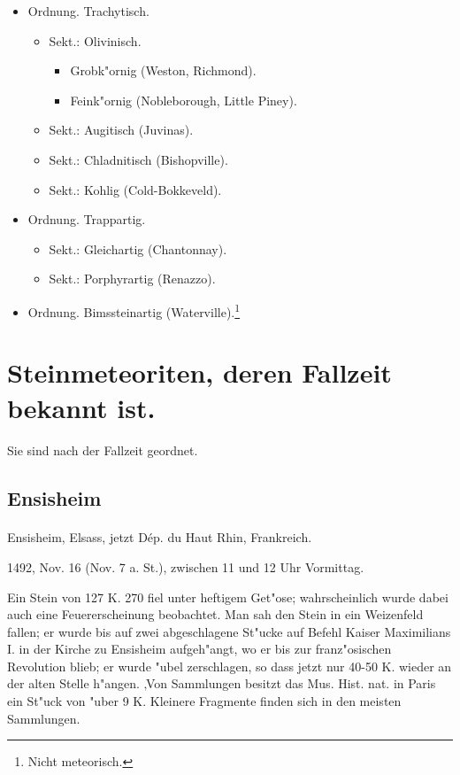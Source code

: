 \documentclass[a4paper, 11pt, oneside]{article}
\begin{document}
\begin{itemize}
    \item[1.] Ordnung. Trachytisch.
    \begin{itemize}
        \item[1.] Sekt.: Olivinisch.
        \begin{itemize}
            \item[a.] Grobk"ornig (Weston, Richmond).
            \item[b.] Feink"ornig (Nobleborough, Little Piney).
        \end{itemize}
        \item[2.] Sekt.: Augitisch (Juvinas).
        \item[3.] Sekt.: Chladnitisch (Bishopville).
        \item[4.] Sekt.: Kohlig (Cold-Bokkeveld).
    \end{itemize}
    \item[2.] Ordnung. Trappartig.
    \begin{itemize}
        \item[1.] Sekt.: Gleichartig (Chantonnay).
        \item[2.] Sekt.: Porphyrartig (Renazzo).
    \end{itemize}
    \item[3.] Ordnung. Bimssteinartig (Waterville).\footnote{Nicht meteorisch.}
\end{itemize}
\clearpage
\section{Steinmeteoriten, deren Fallzeit bekannt ist.}
\paragraph{}
Sie sind nach der Fallzeit geordnet.
\subsection{Ensisheim}
\paragraph{}
Ensisheim, Elsass, jetzt Dép. du Haut Rhin, Frankreich.

1492, Nov. 16 (Nov. 7 a. St.), zwischen 11 und 12 Uhr Vormittag.

Ein Stein von 127 K. 270 fiel unter heftigem Get"ose; wahrscheinlich wurde dabei auch eine Feuererscheinung beobachtet. Man sah den Stein in ein Weizenfeld fallen; er wurde bis auf zwei abgeschlagene St"ucke auf Befehl Kaiser Maximilians I. in der Kirche zu Ensisheim aufgeh"angt, wo er bis zur franz"osischen Revolution blieb; er wurde "ubel zerschlagen, so dass jetzt nur 40-50 K. wieder an der alten Stelle h"angen. ‚Von Sammlungen besitzt das Mus. Hist. nat. in Paris ein St"uck von "uber 9 K. Kleinere Fragmente finden sich in den meisten Sammlungen.
\end{document}
